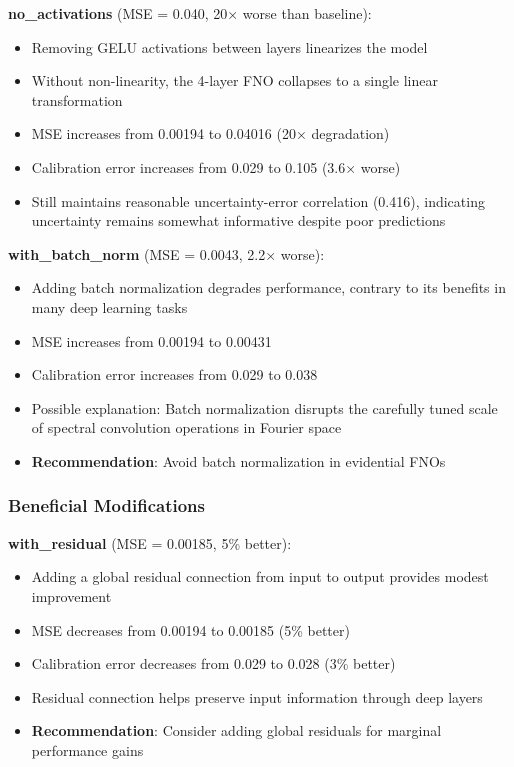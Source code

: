\textbf{no\_activations} (MSE = 0.040, 20× worse than baseline):
\begin{itemize}
\item Removing GELU activations between layers linearizes the model
\item Without non-linearity, the 4-layer FNO collapses to a single linear transformation
\item MSE increases from 0.00194 to 0.04016 (20× degradation)
\item Calibration error increases from 0.029 to 0.105 (3.6× worse)
\item Still maintains reasonable uncertainty-error correlation (0.416), indicating uncertainty remains somewhat informative despite poor predictions
\end{itemize}

\textbf{with\_batch\_norm} (MSE = 0.0043, 2.2× worse):
\begin{itemize}
\item Adding batch normalization degrades performance, contrary to its benefits in many deep learning tasks
\item MSE increases from 0.00194 to 0.00431
\item Calibration error increases from 0.029 to 0.038
\item Possible explanation: Batch normalization disrupts the carefully tuned scale of spectral convolution operations in Fourier space
\item \textbf{Recommendation}: Avoid batch normalization in evidential FNOs
\end{itemize}

\subsubsection{Beneficial Modifications}

\textbf{with\_residual} (MSE = 0.00185, 5\% better):
\begin{itemize}
\item Adding a global residual connection from input to output provides modest improvement
\item MSE decreases from 0.00194 to 0.00185 (5\% better)
\item Calibration error decreases from 0.029 to 0.028 (3\% better)
\item Residual connection helps preserve input information through deep layers
\item \textbf{Recommendation}: Consider adding global residuals for marginal performance gains
\end{itemize}

